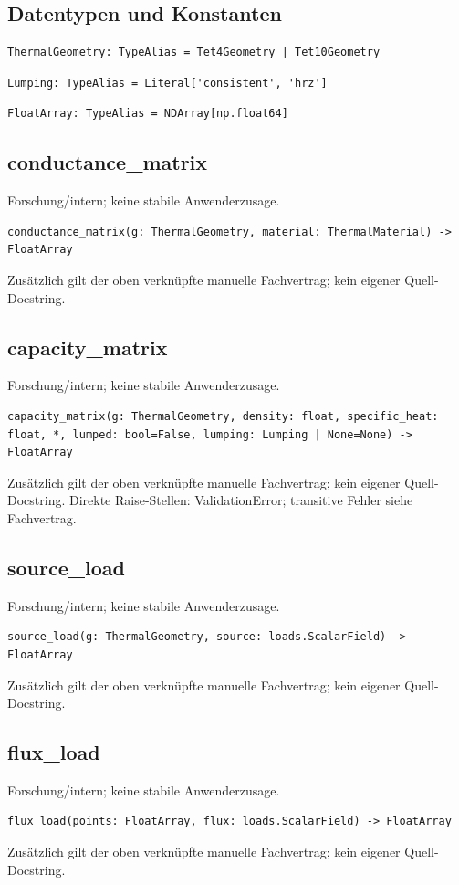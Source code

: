 \subsection*{Datentypen und Konstanten}
\begin{lstlisting}
ThermalGeometry: TypeAlias = Tet4Geometry | Tet10Geometry
\end{lstlisting}
\begin{lstlisting}
Lumping: TypeAlias = Literal['consistent', 'hrz']
\end{lstlisting}
\begin{lstlisting}
FloatArray: TypeAlias = NDArray[np.float64]
\end{lstlisting}
\subsection{conductance\_matrix}
Forschung/intern; keine stabile Anwenderzusage.
\begin{lstlisting}
conductance_matrix(g: ThermalGeometry, material: ThermalMaterial) -> FloatArray
\end{lstlisting}
Zusätzlich gilt der oben verknüpfte manuelle Fachvertrag; kein eigener Quell-Docstring.
\subsection{capacity\_matrix}
Forschung/intern; keine stabile Anwenderzusage.
\begin{lstlisting}
capacity_matrix(g: ThermalGeometry, density: float, specific_heat: float, *, lumped: bool=False, lumping: Lumping | None=None) -> FloatArray
\end{lstlisting}
Zusätzlich gilt der oben verknüpfte manuelle Fachvertrag; kein eigener Quell-Docstring.
Direkte Raise-Stellen: ValidationError; transitive Fehler siehe Fachvertrag.
\subsection{source\_load}
Forschung/intern; keine stabile Anwenderzusage.
\begin{lstlisting}
source_load(g: ThermalGeometry, source: loads.ScalarField) -> FloatArray
\end{lstlisting}
Zusätzlich gilt der oben verknüpfte manuelle Fachvertrag; kein eigener Quell-Docstring.
\subsection{flux\_load}
Forschung/intern; keine stabile Anwenderzusage.
\begin{lstlisting}
flux_load(points: FloatArray, flux: loads.ScalarField) -> FloatArray
\end{lstlisting}
Zusätzlich gilt der oben verknüpfte manuelle Fachvertrag; kein eigener Quell-Docstring.
